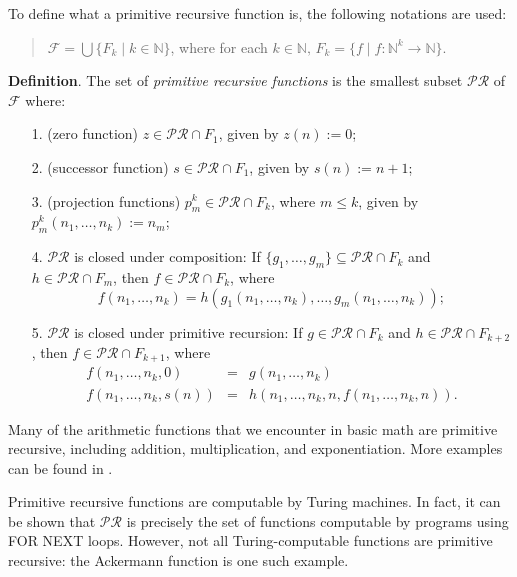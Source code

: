 \documentclass[12pt]{article}
\theoremstyle{definition}
\theoremstyle{remark}
\begin{document}
To define what a primitive recursive function is, the following notations are used:
\begin{quote} $\mathcal{F} = \bigcup \lbrace F_k \mid k \in \mathbb{N}
\rbrace$, where for each $k \in \mathbb{N}\text{, }F_k = \lbrace f \mid f \colon \mathbb{N}^{k}
\to \mathbb{N} \rbrace$. \end{quote}

\textbf{Definition}.  The set of \emph{primitive recursive functions} is the smallest subset $\mathcal{PR}$ of $\mathcal{F}$ where:
	\begin{enumerate}
		\item[1.] (zero function) $z \in \mathcal{PR}\cap F_1$, given by $z(n):=0$;
		\item[2.] (successor function) $s \in \mathcal{PR}\cap F_1$, given by $s(n):=n+1$;
		\item[3.] (projection functions) $p^k_m \in \mathcal{PR}\cap F_k$, where $m\le k$, given by $p^k_m(n_1,\ldots,n_k):=n_m$;
		\item[4.] $\mathcal{PR}$ is closed under composition: If $\lbrace g_1, \ldots, g_m \rbrace \subseteq \mathcal{PR} \cap F_{k}$ and $h \in \mathcal{PR} \cap F_m$, then $f \in \mathcal{PR} \cap F_{k}$, where 
		$$f(n_1,\ldots, n_k) = h(g_1(n_1,  \ldots, n_k), \ldots, g_m(n_1,\ldots, n_k));$$
		
		\item[5.] $\mathcal{PR}$ is closed under primitive recursion: If $g \in \mathcal{PR} \cap F_{k}$ and $h \in \mathcal{PR} \cap F_{k+2}$, then $f \in \mathcal{PR}\cap F_{k+1}$, where   
		\begin{eqnarray*}
		f(n_1, \ldots, n_k, 0) &=& g(n_1, \ldots, n_k) \\ 
		f(n_1, \ldots, n_k, s(n)) &=& h(n_1,  \ldots, n_k, n, f(n_1, \ldots, n_k, n)).
		\end{eqnarray*}
	\end{enumerate}

Many of the arithmetic functions that we encounter in basic math are primitive recursive, including addition, multiplication, and  exponentiation.  More examples can be found in .

Primitive recursive functions are computable by Turing machines.  In fact, it can be shown that $\mathcal{PR}$ is precisely the set of functions computable by programs using FOR NEXT loops.  However, not all Turing-computable functions are primitive recursive: the Ackermann function is one such example.
\end{document}

